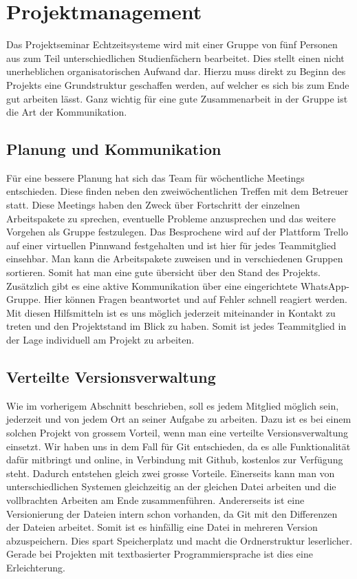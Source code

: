 \section{Projektmanagement}
\label{sec:projektmanagement}
Das Projektseminar Echtzeitsysteme wird mit einer Gruppe von f\"unf Personen aus zum Teil unterschiedlichen Studienf\"achern bearbeitet. Dies stellt einen nicht unerheblichen organisatorischen Aufwand dar. Hierzu muss direkt zu Beginn des Projekts eine Grundstruktur geschaffen werden, auf welcher es sich bis zum Ende gut arbeiten l\"asst. Ganz wichtig f\"ur eine gute Zusammenarbeit in der Gruppe ist die Art der Kommunikation.

\subsection{Planung und Kommunikation}
F\"ur eine bessere Planung hat sich das Team f\"ur w\"ochentliche Meetings entschieden. Diese finden neben den zweiw\"ochentlichen Treffen mit dem Betreuer statt. Diese Meetings haben den Zweck \"uber Fortschritt der einzelnen Arbeitspakete zu sprechen, eventuelle Probleme anzusprechen und das weitere Vorgehen als Gruppe festzulegen. Das Besprochene wird auf der Plattform Trello auf einer virtuellen Pinnwand festgehalten und ist hier f\"ur jedes Teammitglied einsehbar. Man kann die Arbeitspakete zuweisen und in verschiedenen Gruppen sortieren. Somit hat man eine gute \"ubersicht \"uber den Stand des Projekts. Zus\"atzlich gibt es eine aktive Kommunikation \"uber eine eingerichtete WhatsApp-Gruppe. Hier k\"onnen Fragen beantwortet und auf Fehler schnell reagiert werden. Mit diesen Hilfsmitteln ist es uns m\"oglich jederzeit miteinander in Kontakt zu treten und den Projektstand im Blick zu haben. Somit ist jedes Teammitglied in der Lage individuell am Projekt zu arbeiten.

\subsection{Verteilte Versionsverwaltung}
Wie im vorherigem Abschnitt beschrieben, soll es jedem Mitglied m\"oglich sein, jederzeit und von jedem Ort an seiner Aufgabe zu arbeiten. Dazu ist es bei einem solchen Projekt von grossem Vorteil, wenn man eine verteilte Versionsverwaltung einsetzt. Wir haben uns in dem Fall f\"ur Git entschieden, da es alle Funktionalit\"at daf\"ur mitbringt und online, in Verbindung mit Github, kostenlos zur Verf\"ugung steht. Dadurch entstehen gleich zwei grosse Vorteile. Einerseits kann man von unterschiedlichen Systemen gleichzeitig an der gleichen Datei arbeiten und die vollbrachten Arbeiten am Ende zusammenf\"uhren. Andererseits ist eine Versionierung der Dateien intern schon vorhanden, da Git mit den Differenzen der Dateien arbeitet. Somit ist es hinf\"allig eine Datei in mehreren Version abzuspeichern. Dies spart Speicherplatz und macht die Ordnerstruktur leserlicher. Gerade bei Projekten mit textbasierter Programmiersprache ist dies eine Erleichterung.